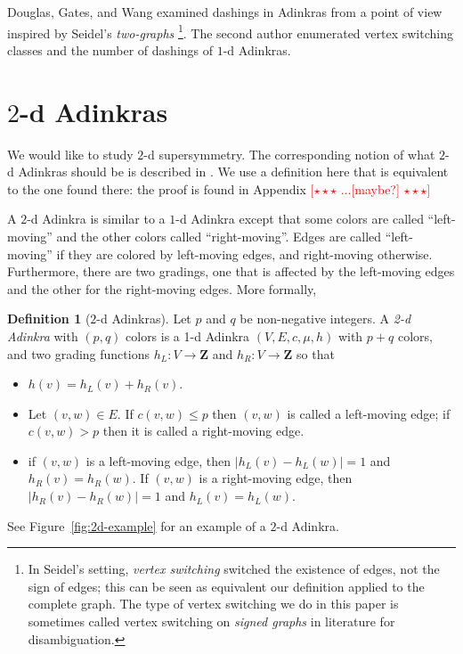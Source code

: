 \documentclass[12pt,twoside,singlespace]{article}
\numberwithin{equation}{section}
\theoremstyle{definition}
\newtheorem{definition}[equation]{Definition}
\newcommand{\ZZ}{\mathbf{Z}}
\newcommand{\com}[1]{\textcolor{red}{$[\star \star \star$ #1 $\star \star \star]$}}
\begin{document}
Douglas, Gates, and Wang \cite{douglas} examined dashings in Adinkras from a point of view inspired by Seidel's \emph{two-graphs} \cite{seidel:survey} \footnote{In Seidel's setting, \emph{vertex switching} switched the existence of edges, not the sign of edges; this can be seen as equivalent our definition applied to the complete graph. The type of vertex switching we do in this paper is sometimes called vertex switching on \emph{signed graphs} in literature for disambiguation.}. The second author \cite{zhang:adinkras} enumerated vertex switching classes and the number of dashings of $1$-d Adinkras.

\section{$2$-d Adinkras}
\label{sec:2d}
We would like to study $2$-d supersymmetry. The corresponding notion of what $2$-d Adinkras should be is described in \cite{gates:dimensional_extension,hubsch:weaving}.  We use a definition here that is equivalent to the one found there: the proof is found in Appendix \com{...[maybe?]}

A $2$-d Adinkra is similar to a $1$-d Adinkra except that some colors are called ``left-moving'' and the other colors called ``right-moving''.  Edges are called ``left-moving'' if they are colored by left-moving edges, and right-moving otherwise.  Furthermore, there are two gradings, one that is affected by the left-moving edges and the other for the right-moving edges. More formally,
\begin{definition}[$2$-d Adinkras]
Let $p$ and $q$ be non-negative integers. A \emph{2-d Adinkra} with $(p,q)$ colors is a 1-d Adinkra $(V,E,c,\mu,h)$ with $p+q$ colors, and two grading functions $h_L:V\to \ZZ$ and $h_R:V\to \ZZ$ so that
\begin{itemize}
\item $h(v)=h_L(v)+h_R(v)$.
\item Let $(v,w)\in E$.  If $c(v,w)\le p$ then $(v,w)$ is called a left-moving edge; if $c(v,w)>p$ then it is called a right-moving edge.
\item if $(v,w)$ is a left-moving edge, then $|h_L(v)-h_L(w)|=1$ and $h_R(v)=h_R(w)$.  If $(v,w)$ is a right-moving edge, then $|h_R(v)-h_R(w)|=1$ and $h_L(v)=h_L(w)$.
\end{itemize}

See Figure~\ref{fig:2d-example} for an example of a $2$-d Adinkra.
\end{definition}
\end{document}
